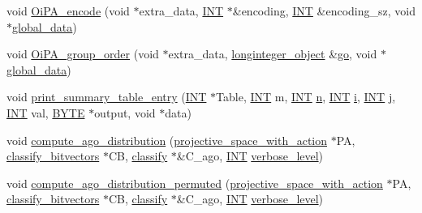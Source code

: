 \begin{DoxyCompactItemize}
\item 
void \mbox{\hyperlink{projective__space__main_8_c_a7ee717b278a36df7300440bf6de5fcdd}{Oi\+P\+A\+\_\+encode}} (void $\ast$extra\+\_\+data, \mbox{\hyperlink{galois_8h_a09fddde158a3a20bd2dcadb609de11dc}{I\+NT}} $\ast$\&encoding, \mbox{\hyperlink{galois_8h_a09fddde158a3a20bd2dcadb609de11dc}{I\+NT}} \&encoding\+\_\+sz, void $\ast$\mbox{\hyperlink{classglobal__data}{global\+\_\+data}})
\item 
void \mbox{\hyperlink{projective__space__main_8_c_ad91b5a6d2b35b598a5df99ce37f85a10}{Oi\+P\+A\+\_\+group\+\_\+order}} (void $\ast$extra\+\_\+data, \mbox{\hyperlink{classlonginteger__object}{longinteger\+\_\+object}} \&\mbox{\hyperlink{simeon_8_c_a1516b736c8ebbfb03a9dd7d8826cd9a6}{go}}, void $\ast$\mbox{\hyperlink{classglobal__data}{global\+\_\+data}})
\item 
void \mbox{\hyperlink{projective__space__main_8_c_a596b002a0d850d6639f26abf716124ed}{print\+\_\+summary\+\_\+table\+\_\+entry}} (\mbox{\hyperlink{galois_8h_a09fddde158a3a20bd2dcadb609de11dc}{I\+NT}} $\ast$Table, \mbox{\hyperlink{galois_8h_a09fddde158a3a20bd2dcadb609de11dc}{I\+NT}} m, \mbox{\hyperlink{galois_8h_a09fddde158a3a20bd2dcadb609de11dc}{I\+NT}} \mbox{\hyperlink{simeon_8_c_a7f2cd26777ce0ff3fdaf8d02aacbddfb}{n}}, \mbox{\hyperlink{galois_8h_a09fddde158a3a20bd2dcadb609de11dc}{I\+NT}} \mbox{\hyperlink{alphabet2_8_c_acb559820d9ca11295b4500f179ef6392}{i}}, \mbox{\hyperlink{galois_8h_a09fddde158a3a20bd2dcadb609de11dc}{I\+NT}} \mbox{\hyperlink{alphabet2_8_c_a37d972ae0b47b9099e30983131d31916}{j}}, \mbox{\hyperlink{galois_8h_a09fddde158a3a20bd2dcadb609de11dc}{I\+NT}} val, \mbox{\hyperlink{galois_8h_ab6cc7b4aeb6ea31aba2b3fbfc83ff5e6}{B\+Y\+TE}} $\ast$output, void $\ast$data)
\item 
void \mbox{\hyperlink{projective__space__main_8_c_a63c9db9ca280b83f386e3dea5f30fa98}{compute\+\_\+ago\+\_\+distribution}} (\mbox{\hyperlink{classprojective__space__with__action}{projective\+\_\+space\+\_\+with\+\_\+action}} $\ast$PA, \mbox{\hyperlink{classclassify__bitvectors}{classify\+\_\+bitvectors}} $\ast$CB, \mbox{\hyperlink{classclassify}{classify}} $\ast$\&C\+\_\+ago, \mbox{\hyperlink{galois_8h_a09fddde158a3a20bd2dcadb609de11dc}{I\+NT}} \mbox{\hyperlink{simeon_8_c_a818073fbcc2f439e7c56952f67386122}{verbose\+\_\+level}})
\item 
void \mbox{\hyperlink{projective__space__main_8_c_a1d8c812b2637be8e72d8ae3dfdc8c3df}{compute\+\_\+ago\+\_\+distribution\+\_\+permuted}} (\mbox{\hyperlink{classprojective__space__with__action}{projective\+\_\+space\+\_\+with\+\_\+action}} $\ast$PA, \mbox{\hyperlink{classclassify__bitvectors}{classify\+\_\+bitvectors}} $\ast$CB, \mbox{\hyperlink{classclassify}{classify}} $\ast$\&C\+\_\+ago, \mbox{\hyperlink{galois_8h_a09fddde158a3a20bd2dcadb609de11dc}{I\+NT}} \mbox{\hyperlink{simeon_8_c_a818073fbcc2f439e7c56952f67386122}{verbose\+\_\+level}})

\end{DoxyCompactItemize}
